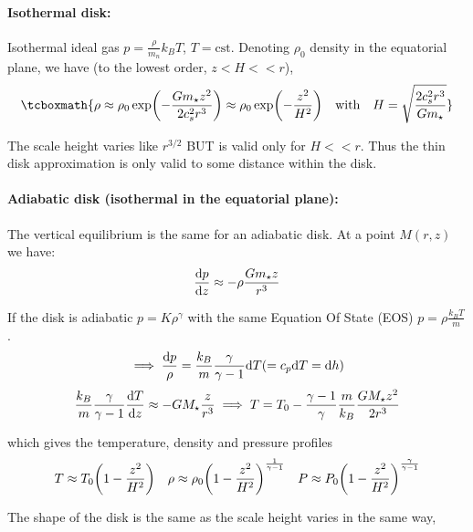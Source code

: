 \documentclass[10pt,a4paper,english]{article}
\let\originalleft\left
\let\originalright\right
\renewcommand{\left}{\mathopen{}\mathclose\bgroup\originalleft}
\renewcommand{\right}{\aftergroup\egroup\originalright}
\begin{document}
\paragraph{Isothermal disk:} Isothermal ideal gas $p=\frac{\rho}{m_n}k_B T$, $T=\text{cst}$. Denoting $\rho_0$ density in the equatorial plane, we have (to the lowest order, $z<H<<r$),
\begin{equation}
\tcboxmath{\rho \approx \rho_0 \exp \left(-\frac{G m_\star z^2}{2 c_s^2 r^3} \right) \approx \rho_0 \exp \left(-\frac{z^2}{H^2} \right) \quad \text{with} \quad H = \sqrt{\frac{2 c_s^2 r^3}{G m_\star}}}
\end{equation}

The scale height varies like $r^{3/2}$ BUT is valid only for $H<<r$. Thus the thin disk approximation is only valid to some distance within the disk.


\paragraph{Adiabatic disk (isothermal in the equatorial plane):} The vertical equilibrium is the same for an adiabatic disk. At a point $M(r,z)$ we have:
\begin{equation}
\frac{\mathrm{d} p}{\mathrm{d} z} \approx -\rho\frac{G m_\star z}{r^3}
\end{equation}

If the disk is adiabatic $p=K \rho^\gamma$ with the same Equation Of State (EOS) $p=\rho \frac{k_B T}{m}$.
\begin{equation}
\implies \frac{\mathrm{d} p}{\rho} = \frac{k_B}{m}\frac{\gamma}{\gamma - 1}\mathrm{d} T (=c_p \mathrm{d} T = \mathrm{d} h)
\end{equation}
\begin{equation}
\frac{k_B}{m}\frac{\gamma}{\gamma - 1}\frac{\mathrm{d} T }{\mathrm{d} z} \approx -G M_\star \frac{z}{r^3} \implies T = T_0 - \frac{\gamma - 1}{\gamma}\frac{m}{k_B}\frac{G M_\star z^2}{2r^3}
\end{equation}

which gives the temperature, density and pressure profiles
\begin{equation}
T \approx T_0\left( 1-\frac{z^2}{H^2} \right) \quad \rho \approx \rho_0\left( 1-\frac{z^2}{H^2} \right)^{\frac{1}{\gamma - 1}} \quad P \approx P_0\left( 1-\frac{z^2}{H^2} \right)^{\frac{\gamma}{\gamma - 1}}
\end{equation}

The shape of the disk is the same as the scale height varies in the same way,
\end{document}
